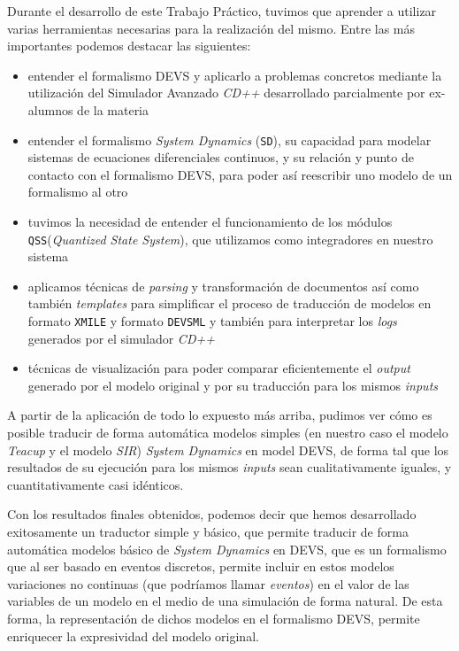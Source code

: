 Durante el desarrollo de este Trabajo Práctico, tuvimos que aprender a utilizar varias herramientas necesarias para la realización del mismo. Entre las más importantes podemos destacar las siguientes:
\begin{itemize}
\item entender el formalismo DEVS y aplicarlo a problemas concretos mediante la utilización del Simulador Avanzado \textit{CD++} desarrollado parcialmente por ex-alumnos de la materia
\item entender el formalismo \textit{System Dynamics} (\texttt{SD}), su capacidad para modelar sistemas de ecuaciones diferenciales continuos, y su relación y punto de contacto con el formalismo DEVS, para poder así reescribir uno modelo de un formalismo al otro
\item tuvimos la necesidad de entender el funcionamiento de los módulos \texttt{QSS}(\textit{Quantized State System}), que utilizamos como integradores en nuestro sistema
\item aplicamos técnicas de \textit{parsing} y transformación de documentos así como también \textit{templates} para simplificar el proceso de traducción de modelos en formato \texttt{XMILE} y formato \texttt{DEVSML} y también para interpretar los \textit{logs} generados por el simulador \textit{CD++}
\item técnicas de visualización para poder comparar eficientemente el \textit{output} generado por el modelo original y por su traducción para los mismos \textit{inputs}
\end{itemize}

A partir de la aplicación de todo lo expuesto más arriba, pudimos ver cómo es posible traducir de forma automática modelos simples (en nuestro caso el modelo \textit{Teacup} y el modelo \textit{SIR}) \textit{System Dynamics} en model DEVS, de forma tal que los resultados de su ejecución para los mismos \textit{inputs} sean cualitativamente iguales, y cuantitativamente casi idénticos.

Con los resultados finales obtenidos, podemos decir que hemos desarrollado exitosamente un traductor simple y básico, que permite traducir de forma automática modelos básico de \textit{System Dynamics} en DEVS, que es un formalismo que al ser basado en eventos discretos, permite incluir en estos modelos variaciones no continuas (que podríamos llamar \textit{eventos}) en el valor de las variables de un modelo en el medio de una simulación de forma natural. De esta forma, la representación de dichos modelos en el formalismo DEVS, permite enriquecer la expresividad del modelo original.